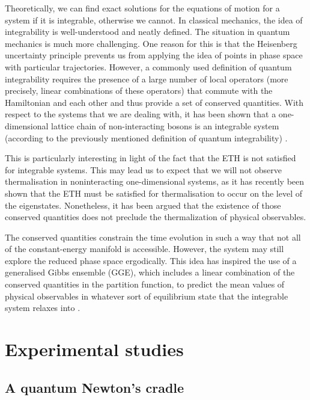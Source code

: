 \documentclass[a4paper, 10pt]{article}
\theoremstyle{plain}
\begin{document}
Theoretically, we can find exact solutions for the equations of motion for a
system if it is integrable, otherwise we cannot. In classical mechanics, the
idea of integrability is well-understood and neatly defined. The situation in
quantum mechanics is much more challenging. One reason for this is that
the Heisenberg uncertainty principle prevents us from applying the idea of
points in phase space with particular trajectories. However, a commonly 
used definition of quantum integrability requires the presence of a large 
number of local operators (more precisely, linear combinations of these 
operators) that commute with the Hamiltonian and each other and thus provide a 
set of conserved quantities. With respect to the systems that we are dealing 
with, it has been shown that a one-dimensional lattice chain of non-interacting 
bosons is an integrable system (according to the previously 
mentioned definition of quantum integrability) \cite{Rigol2007}.

This is particularly interesting in light of the fact that the ETH is not 
satisfied for integrable systems. This may lead us to expect that we will 
not observe thermalisation in noninteracting one-dimensional systems, as it 
has recently been shown that the ETH must be satisfied for thermalisation to 
occur \cite{Palma2015} on the level of the eigenstates. Nonetheless, it has 
been argued \cite{DAlessio2016} that the existence of those conserved 
quantities does not preclude the thermalization of physical observables. 

The conserved quantities constrain the time evolution in such a way that not 
all of the constant-energy manifold is accessible. However, the system may 
still explore the reduced phase space ergodically. This idea has inspired 
the use of a generalised Gibbs ensemble (GGE), which includes a linear 
combination of the conserved quantities in the partition function, to predict 
the mean values of physical observables in whatever sort of equilibrium 
state that the integrable system relaxes into \cite{Rigol2007}.
\newpage
\section{Experimental studies}

\subsection{A quantum Newton's cradle}
\end{document}
